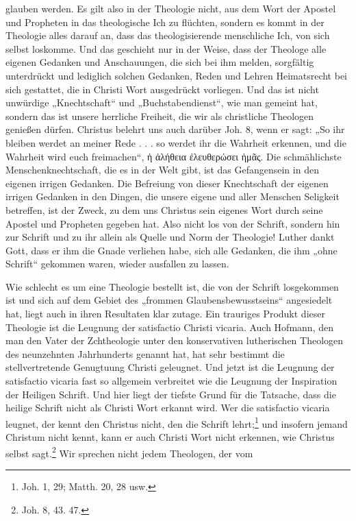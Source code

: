glauben werden. Es gilt also in der Theologie nicht, aus dem Wort der Apostel und Propheten in das theologische Ich zu flüchten, sondern es kommt in der Theologie alles darauf an, dass das theologisierende menschliche Ich, von sich selbst loskomme. Und das geschieht nur in der Weise, dass der Theologe alle eigenen Gedanken und Anschauungen, die sich bei ihm melden, sorgfältig unterdrückt und lediglich solchen Gedanken, Reden und Lehren Heimatsrecht bei sich gestattet, die in Christi Wort ausgedrückt vorliegen. Und das ist nicht unwürdige „Knechtschaft“ und „Buchstabendienst“, wie man gemeint hat, sondern das ist unsere herrliche Freiheit, die wir als christliche Theologen genießen dürfen. Christus belehrt uns auch darüber Joh. 8, wenn er sagt: „So ihr bleiben werdet an meiner Rede . . . so werdet ihr die Wahrheit erkennen, und die Wahrheit wird euch freimachen“, {\foreignlanguage{greek}{ἡ ἀλήθεια ἐλευθερώσει ἡμᾶς}}. Die schmählichste Menschenknechtschaft, die es in der Welt gibt, ist das Gefangensein in den eigenen irrigen Gedanken. Die Befreiung von dieser Knechtschaft der eigenen irrigen Gedanken in den Dingen, die unsere eigene und aller Menschen Seligkeit betreffen, ist der Zweck, zu dem uns Christus sein eigenes Wort durch seine Apostel und Propheten gegeben hat. Also nicht los von der Schrift, sondern hin zur Schrift und zu ihr allein als Quelle und Norm der Theologie! Luther dankt Gott, dass er ihm die Gnade verliehen habe, sich alle Gedanken, die ihm „ohne Schrift“ gekommen waren, wieder ausfallen zu lassen.\par Wie schlecht es um eine Theologie bestellt ist, die von der Schrift losgekommen ist und sich auf dem Gebiet des „frommen Glaubensbewusstseins“ angesiedelt hat, liegt auch in ihren Resultaten klar zutage. Ein trauriges Produkt dieser Theologie ist die Leugnung der satisfactio Christi vicaria. Auch Hofmann, den man den Vater der Zchtheologie unter den konservativen lutherischen Theologen des neunzehnten Jahrhunderts genannt hat, hat sehr bestimmt die stellvertretende Genugtuung Christi geleugnet. Und jetzt ist die Leugnung der satisfactio vicaria fast so allgemein verbreitet wie die Leugnung der Inspiration der Heiligen Schrift. Und hier liegt der tiefste Grund für die Tatsache, dass die heilige Schrift nicht als Christi Wort erkannt wird. Wer die satisfactio vicaria leugnet, der kennt den Christus nicht, den die Schrift lehrt;\footnote{Joh. 1, 29; Matth. 20, 28 usw.} und insofern jemand Christum nicht kennt, kann er auch Christi Wort nicht erkennen, wie Christus selbst sagt.\footnote{Joh. 8, 43. 47.} Wir sprechen nicht jedem Theologen, der vom